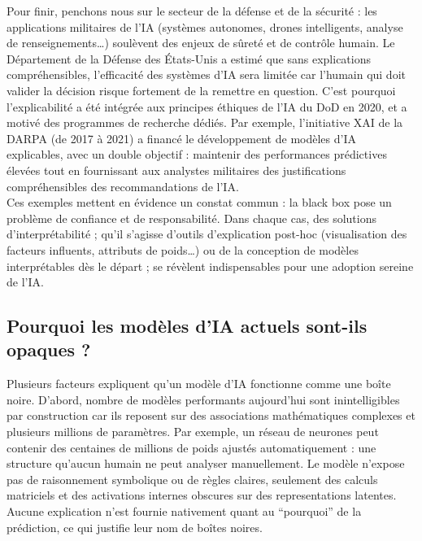 \documentclass{article}
\begin{document}
Pour finir, penchons nous sur le secteur de la défense et de la sécurité : les applications militaires de l’IA (systèmes autonomes, drones intelligents, analyse de renseignements…) soulèvent des enjeux de sûreté et de contrôle humain. Le Département de la Défense des États-Unis a estimé que sans explications compréhensibles, l’efficacité des systèmes d’IA sera limitée car l’humain qui doit valider la décision risque fortement de la remettre en question. C’est pourquoi l’explicabilité a été intégrée aux principes éthiques de l’IA du DoD en 2020, et a motivé des programmes de recherche dédiés. Par exemple, l’initiative XAI de la DARPA (de 2017 à 2021) a financé le développement de modèles d’IA explicables, avec un double objectif : maintenir des performances prédictives élevées tout en fournissant aux analystes militaires des justifications compréhensibles des recommandations de l’IA.\\

Ces exemples mettent en évidence un constat commun : la black box pose un problème de confiance et de responsabilité. Dans chaque cas, des solutions d’interprétabilité ; qu’il s’agisse d’outils d’explication post-hoc (visualisation des facteurs influents, attributs de poids…) ou de la conception de modèles interprétables dès le départ ; se révèlent indispensables pour une adoption sereine de l’IA.

\subsection{Pourquoi les modèles d’IA actuels sont-ils opaques ?}

\quad Plusieurs facteurs expliquent qu’un modèle d’IA fonctionne comme une boîte noire. D’abord, nombre de modèles performants aujourd’hui sont inintelligibles par construction car ils reposent sur des associations mathématiques complexes et plusieurs millions de paramètres. Par exemple, un réseau de neurones peut contenir des centaines de millions de poids ajustés automatiquement : une structure qu’aucun humain ne peut analyser manuellement. Le modèle n’expose pas de raisonnement symbolique ou de règles claires, seulement des calculs matriciels et des activations internes obscures sur des representations latentes. Aucune explication n’est fournie nativement quant au “pourquoi” de la prédiction, ce qui justifie leur nom de boîtes noires.\\
\end{document}
